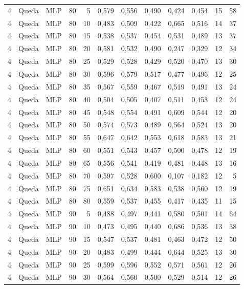 \begin{longtable}{@{}rllrrrrrrrrr@{}}
4 & Queda & MLP & 80 & 5 & 0,579 & 0,556 & 0,490 & 0,424 & 0,454 & 15 & 58 \\
4 & Queda & MLP & 80 & 10 & 0,483 & 0,509 & 0,422 & 0,665 & 0,516 & 14 & 37 \\
4 & Queda & MLP & 80 & 15 & 0,538 & 0,537 & 0,454 & 0,531 & 0,489 & 13 & 37 \\
4 & Queda & MLP & 80 & 20 & 0,581 & 0,532 & 0,490 & 0,247 & 0,329 & 12 & 34 \\
4 & Queda & MLP & 80 & 25 & 0,529 & 0,528 & 0,429 & 0,520 & 0,470 & 13 & 30 \\
4 & Queda & MLP & 80 & 30 & 0,596 & 0,579 & 0,517 & 0,477 & 0,496 & 12 & 25 \\
4 & Queda & MLP & 80 & 35 & 0,567 & 0,559 & 0,467 & 0,519 & 0,491 & 13 & 24 \\
4 & Queda & MLP & 80 & 40 & 0,504 & 0,505 & 0,407 & 0,511 & 0,453 & 12 & 24 \\
4 & Queda & MLP & 80 & 45 & 0,548 & 0,554 & 0,491 & 0,609 & 0,544 & 12 & 20 \\
4 & Queda & MLP & 80 & 50 & 0,574 & 0,573 & 0,489 & 0,564 & 0,524 & 13 & 20 \\
4 & Queda & MLP & 80 & 55 & 0,647 & 0,642 & 0,553 & 0,618 & 0,583 & 13 & 21 \\
4 & Queda & MLP & 80 & 60 & 0,551 & 0,543 & 0,457 & 0,500 & 0,478 & 12 & 19 \\
4 & Queda & MLP & 80 & 65 & 0,556 & 0,541 & 0,419 & 0,481 & 0,448 & 13 & 16 \\
4 & Queda & MLP & 80 & 70 & 0,597 & 0,528 & 0,600 & 0,107 & 0,182 & 12 & 5 \\
4 & Queda & MLP & 80 & 75 & 0,651 & 0,634 & 0,583 & 0,538 & 0,560 & 12 & 19 \\
4 & Queda & MLP & 80 & 80 & 0,559 & 0,537 & 0,455 & 0,417 & 0,435 & 11 & 15 \\
4 & Queda & MLP & 90 & 5 & 0,488 & 0,497 & 0,441 & 0,580 & 0,501 & 14 & 64 \\
4 & Queda & MLP & 90 & 10 & 0,473 & 0,495 & 0,440 & 0,686 & 0,536 & 13 & 38 \\
4 & Queda & MLP & 90 & 15 & 0,547 & 0,537 & 0,481 & 0,463 & 0,472 & 12 & 50 \\
4 & Queda & MLP & 90 & 20 & 0,483 & 0,499 & 0,444 & 0,644 & 0,525 & 13 & 30 \\
4 & Queda & MLP & 90 & 25 & 0,599 & 0,596 & 0,552 & 0,571 & 0,561 & 12 & 26 \\
4 & Queda & MLP & 90 & 30 & 0,564 & 0,560 & 0,500 & 0,529 & 0,514 & 12 & 26 \\

\end{longtable}
